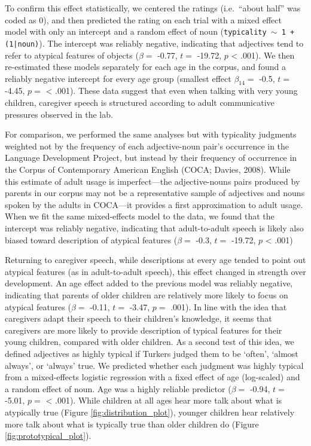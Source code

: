\documentclass[10pt, letterpaper]{article}
\begin{document}
To confirm this effect statistically, we centered the ratings
(i.e.~``about half'' was coded as 0), and then predicted the rating on
each trial with a mixed effect model with only an intercept and a random
effect of noun (\texttt{typicality $\sim$ 1 + (1|noun)}). The intercept
was reliably negative, indicating that adjectives tend to refer to
atypical features of objects (\(\beta =\) -0.77, \(t =\) -19.72, \(p\)
\textless{} .001). We then re-estimated these models separately for each
age in the corpus, and found a reliably negative intercept for every age
group (smallest effect \(\beta_{14} =\) -0.5, \(t =\) -4.45, \(p =\)
\textless{} .001). These data suggest that even when talking with very
young children, caregiver speech is structured according to adult
communicative pressures observed in the lab.

For comparison, we performed the same analyses but with typicality
judgments weighted not by the frequency of each adjective-noun pair's
occurrence in the Language Development Project, but instead by their
frequency of occurrence in the Corpus of Contemporary American English
(COCA; Davies, 2008). While this estimate of adult usage is
imperfect---the adjective-nouns pairs produced by parents in our corpus
may not be a representative sample of adjectives and nouns spoken by the
adults in COCA---it provides a first approximation to adult usage. When
we fit the same mixed-effects model to the data, we found that the
intercept was reliably negative, indicating that adult-to-adult speech
is likely also biased toward description of atypical features
(\(\beta =\) -0.3, \(t =\) -19.72, \(p\) \textless{} .001)

Returning to caregiver speech, while descriptions at every age tended to
point out atypical features (as in adult-to-adult speech), this effect
changed in strength over development. An age effect added to the
previous model was reliably negative, indicating that parents of older
children are relatively more likely to focus on atypical features
(\(\beta =\) -0.11, \(t =\) -3.47, \(p =\) .001). In line with the idea
that caregivers adapt their speech to their children's knowledge, it
seems that caregivers are more likely to provide description of typical
features for their young children, compared with older children. As a
second test of this idea, we defined adjectives as highly typical if
Turkers judged them to be `often', `almost always', or `always' true. We
predicted whether each judgment was highly typical from a mixed-effects
logistic regression with a fixed effect of age (log-scaled) and a random
effect of noun. Age was a highly reliable predictor (\(\beta =\) -0.94,
\(t =\) -5.01, \(p =\) \textless{} .001). While children at all ages
hear more talk about what is atypically true (Figure
\ref{fig:distribution_plot}), younger children hear relatively more talk
about what is typically true than older children do (Figure
\ref{fig:prototypical_plot}).
\end{document}
